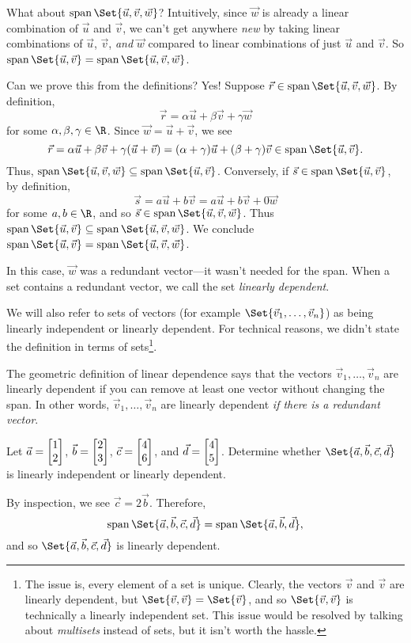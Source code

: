 What about $\Span\Set{\vec u,\vec v,\vec w}$? Intuitively, since $\vec w$ is already
a linear combination of $\vec u$ and $\vec v$, we can't get anywhere \emph{new} by
taking linear combinations of $\vec u$, $\vec v$, \emph{and} $\vec w$ compared to linear combinations
of just $\vec u$ and $\vec v$. So $\Span\Set{\vec u,\vec v}=\Span\Set{\vec u,\vec v,\vec w}$.

Can we prove this from the definitions? Yes! Suppose $\vec r\in \Span\Set{\vec u,\vec v,\vec w}$.
By definition,
\[
	\vec r=\alpha\vec u+\beta\vec v+\gamma\vec w
\] for some $\alpha,\beta,\gamma\in\R$. Since $\vec w=\vec u+\vec v$, we see
\[
	\vec r=\alpha\vec u+\beta\vec v+\gamma(\vec u+\vec v) 
	= (\alpha+\gamma)\vec u+(\beta+\gamma)\vec v\in\Span\Set{\vec u,\vec v}.
\]
Thus, $\Span\Set{\vec u,\vec v,\vec w}\subseteq \Span\Set{\vec u,\vec v}$. Conversely, if $\vec s\in\Span\Set{\vec u,\vec v}$,
by definition,
\[
	\vec s=a\vec u+b\vec v=a\vec u+b\vec v+0\vec w
\]
for some $a,b\in \R$,
and so $\vec s\in\Span\Set{\vec u,\vec v,\vec w}$. Thus $\Span\Set{\vec u,\vec v}\subseteq\Span\Set{\vec u,\vec v,\vec w}$.
We conclude $\Span\Set{\vec u,\vec v}=\Span\Set{\vec u,\vec v,\vec w}$.

In this case, $\vec w$ was a redundant vector---it wasn't needed for the span. When a set contains
a redundant vector, we call the set \emph{linearly dependent}.


We will also refer to sets of vectors (for example $\Set{\vec v_1,\ldots,\vec v_n}$) as being linearly
independent or linearly dependent. For technical reasons, we didn't state the definition in terms
of sets\footnote{ The issue is, every element of a set is unique. Clearly, the vectors $\vec v$ and $\vec v$
are linearly dependent, but $\Set{\vec v,\vec v}=\Set{\vec v}$, and so $\Set{\vec v,\vec v}$ is technically
a linearly independent set. This issue would be resolved by talking about \emph{multisets} instead of sets,
but it isn't worth the hassle.}.

The geometric definition of linear dependence says that the vectors $\vec v_1,\ldots,\vec v_n$ are linearly dependent
if you can remove at least one vector without changing the span. In other words, $\vec v_1,\ldots,\vec v_n$ 
are linearly dependent \emph{if there is a redundant vector}.

\begin{example}
	\label{EXLINDEP}
	Let $\vec a=\mat{1\\2}$, $\vec b=\mat{2\\3}$, $\vec c=\mat{4\\6}$, and $\vec d=\mat{4\\5}$. Determine whether
	$\Set{\vec a,\vec b,\vec c,\vec d}$ is linearly independent or linearly dependent.

	By inspection, we see $\vec c=2\vec b$. Therefore,
	\[
		\Span\Set{\vec a,\vec b,\vec c,\vec d}=\Span\Set{\vec a,\vec b,\vec d},
	\]
	and so $\Set{\vec a,\vec b,\vec c,\vec d}$ is linearly dependent.
\end{example}

